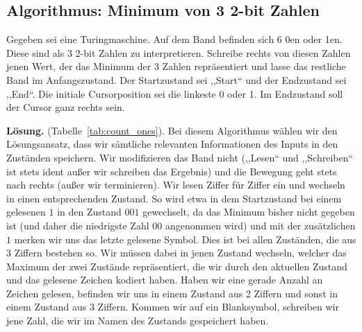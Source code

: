 \subsection{Algorithmus: Minimum von 3 2-bit Zahlen}
%
Gegeben sei eine Turingmaschine. Auf dem Band befinden sich 6 0en oder 1en. Diese sind als 3 2-bit Zahlen zu interpretieren. Schreibe rechts von diesen Zahlen jenen Wert, der das Minimum der 3 Zahlen repräsentiert und lasse das restliche Band im Anfangszustand. Der Startzustand sei ,,Start`` und der Endzustand sei ,,End``. Die initiale Cursorposition sei die linkeste 0 oder 1. Im Endzustand soll der Cursor ganz rechts sein.

\textbf{Lösung.} (Tabelle~\ref{tab:count_ones}). Bei diesem Algorithmus wählen wir den Lösungsansatz, dass wir sämtliche relevanten Informationen des Inputs in den Zuständen speichern. Wir modifizieren das Band nicht (,,Lesen`` und ,,Schreiben`` ist stets ident außer wir schreiben das Ergebnis) und die Bewegung geht stets nach rechts (außer wir terminieren). Wir lesen Ziffer für Ziffer ein und wechseln in einen entsprechenden Zustand. So wird etwa in dem Startzustand bei einem gelesenen $1$ in den Zustand $001$ gewechselt, da das Minimum bisher nicht gegeben ist (und daher die niedrigste Zahl $00$ angenommen wird) und mit der zusätzlichen $1$ merken wir uns das letzte gelesene Symbol. Dies ist bei allen Zuständen, die aus 3 Ziffern bestehen so. Wir müssen dabei in jenen Zustand wechseln, welcher das Maximum der zwei Zustände repräsentiert, die wir durch den aktuellen Zustand und das gelesene Zeichen kodiert haben. Haben wir eine gerade Anzahl an Zeichen gelesen, befinden wir uns in einem Zustand aus 2 Ziffern und sonst in einem Zustand aus 3 Ziffern. Kommen wir auf ein Blanksymbol, schreiben wir jene Zahl, die wir im Namen des Zustands gespeichert haben.
%
